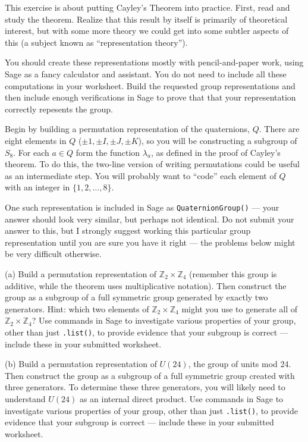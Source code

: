 \begin{sageverbatim}\end{sageverbatim}
%
%
This exercise is about putting Cayley's Theorem into practice.  First, read and study the theorem.  Realize that this result by itself is primarily of theoretical interest, but with some more theory we could get into some subtler aspects of this (a subject known as ``representation theory'').\par
%
You should create these representations mostly with pencil-and-paper work, using Sage as a fancy calculator and assistant.  You do not need to include all these computations in your worksheet.  Build the requested group representations and then include enough verifications in Sage to prove that that your representation correctly repesents the group.\par
%
Begin by building a permutation representation of the quaternions, $Q$.  There are eight elements in $Q$ ($\pm 1, \pm I, \pm J, \pm K$), so you will be constructing a subgroup of $S_8$.  For each $a\in Q$ form the function $\lambda_a$, as defined in the proof of Cayley's theorem.  To do this, the two-line version of writing permutations could be useful as an intermediate step.  You will probably want to ``code'' each element of $Q$ with an integer in $\{1,2,\dots,8\}$.\par
%
One such representation is included in Sage as \verb?QuaternionGroup()? --- your answer should look very similar, but perhaps not identical.  Do not submit your answer to this, but I strongly suggest working this particular group representation until you are sure you have it right --- the problems below might be very difficult otherwise.\par
%
(a) Build a permutation representation of ${\mathbb Z}_2\times{\mathbb Z}_4$ (remember this group is additive, while the theorem uses multiplicative notation).  Then construct the group as a subgroup of a full symmetric group generated by exactly two generators.  Hint: which two elements of ${\mathbb Z}_2\times{\mathbb Z}_4$ might you use to generate all of ${\mathbb Z}_2\times{\mathbb Z}_4$?  Use commands in Sage to investigate various properties of your group, other than just \verb?.list()?, to provide evidence that your subgroup is correct --- include these in your submitted worksheet.\par
%
(b) Build a permutation representation of $U(24)$, the group of units mod 24.  Then construct the group as a subgroup of a full symmetric group created with three generators.  To determine these three generators, you will likely need to understand $U(24)$ as an internal direct product.  Use commands in Sage to investigate various properties of your group, other than just \verb?.list()?, to provide evidence that your subgroup is correct --- include these in your submitted worksheet.

